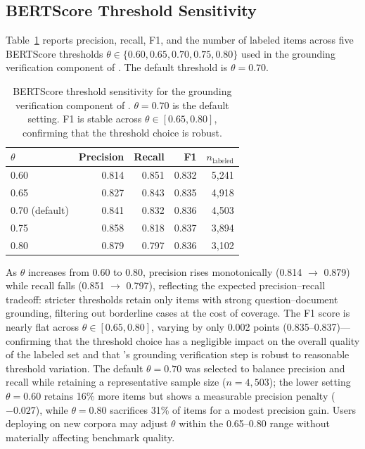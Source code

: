 \subsection{BERTScore Threshold Sensitivity}
\label{sec:bertscore-sensitivity}

Table~\ref{tab:bertscore-threshold} reports precision, recall, F1, and the number of labeled items across five BERTScore thresholds $\theta \in \{0.60, 0.65, 0.70, 0.75, 0.80\}$ used in the grounding verification component of \method{}. The default threshold is $\theta = 0.70$.

\begin{table}[t]
\centering
\footnotesize
\setlength{\tabcolsep}{3.5pt}
\caption{BERTScore threshold sensitivity for the grounding verification component of \method{}. $\theta = 0.70$ is the default setting. F1 is stable across $\theta \in [0.65, 0.80]$, confirming that the threshold choice is robust.}
\label{tab:bertscore-threshold}
\begin{tabular}{lrrrr}
\toprule
$\theta$ & Precision & Recall & F1 & $n_{\text{labeled}}$ \\
\midrule
0.60          & 0.814 & 0.851 & 0.832 & 5{,}241 \\
0.65          & 0.827 & 0.843 & 0.835 & 4{,}918 \\
0.70 (default) & 0.841 & 0.832 & 0.836 & 4{,}503 \\
0.75          & 0.858 & 0.818 & 0.837 & 3{,}894 \\
0.80          & 0.879 & 0.797 & 0.836 & 3{,}102 \\
\bottomrule
\end{tabular}
\end{table}

As $\theta$ increases from 0.60 to 0.80, precision rises monotonically (0.814 $\to$ 0.879) while recall falls (0.851 $\to$ 0.797), reflecting the expected precision--recall tradeoff: stricter thresholds retain only items with strong question--document grounding, filtering out borderline cases at the cost of coverage. The F1 score is nearly flat across $\theta \in [0.65, 0.80]$, varying by only 0.002 points (0.835--0.837)---confirming that the threshold choice has a negligible impact on the overall quality of the labeled set and that \method{}'s grounding verification step is robust to reasonable threshold variation. The default $\theta = 0.70$ was selected to balance precision and recall while retaining a representative sample size ($n = 4{,}503$); the lower setting $\theta = 0.60$ retains 16\% more items but shows a measurable precision penalty ($-0.027$), while $\theta = 0.80$ sacrifices 31\% of items for a modest precision gain. Users deploying \method{} on new corpora may adjust $\theta$ within the 0.65--0.80 range without materially affecting benchmark quality.

